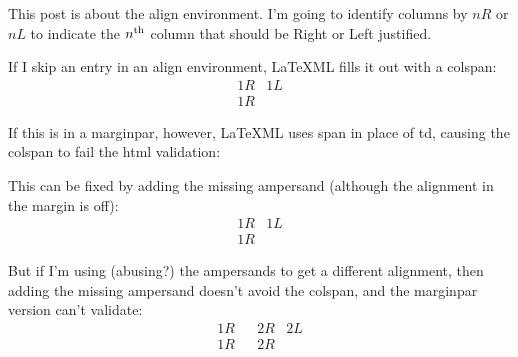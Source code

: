 \documentclass[oneside]{book}
\begin{document}
\pagestyle{empty}

%
%
%
%


This post is about the align environment.  I'm going to identify columns by $nR$ or $nL$ to indicate the $n\textsuperscript{th}$ column that should be Right or Left justified.

If I skip an entry in an align environment, LaTeXML fills it out with a colspan:
\begin{align*}1R&1L\\1R\end{align*} %

If this is in a marginpar, however, LaTeXML uses span in place of td, causing the colspan to fail the html validation:

This can be fixed by adding the missing ampersand (although the alignment in the margin is off):
\begin{align*}1R&1L\\1R&\end{align*} %

But if I'm using (abusing?) the ampersands to get a different alignment, then adding the missing ampersand doesn't avoid the colspan, and the marginpar version can't validate:
\begin{align*}1R&&2R&2L\\1R&&2R&\end{align*}
\end{document}
